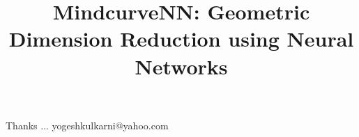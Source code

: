 \documentclass[xcolor=dvipsnames,compress,t,pdf,9pt]{beamer}
\title[\insertframenumber /\inserttotalframenumber]{MindcurveNN: Geometric Dimension Reduction using Neural Networks}
\subtitle[]{}
\begin{document}
	\begin{frame}
	\titlepage
%
	\end{frame}
	
%	
	
	
	\begin{frame}[c]{}
	Thanks ...
	\vspace{5mm}
	yogeshkulkarni@yahoo.com
	\end{frame}
\end{document}
